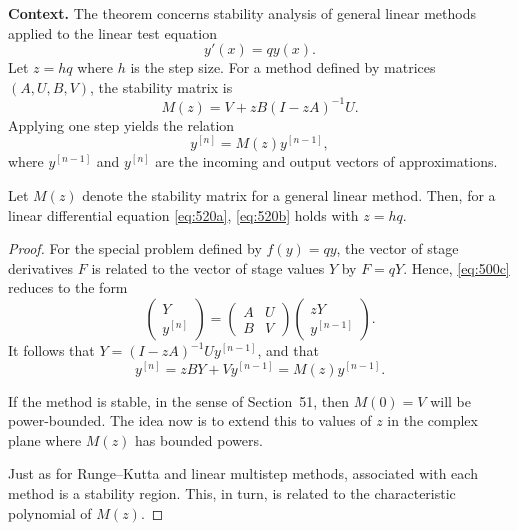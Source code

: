 \noindent\textbf{Context.}
The theorem concerns stability analysis of general linear methods applied to the linear test equation
\begin{equation}
y'(x)=qy(x). \tag{520a}
\end{equation}
Let \(z=hq\) where \(h\) is the step size. For a method defined by matrices \((A,U,B,V)\), the stability matrix is
\[
M(z)=V+zB(I-zA)^{-1}U.
\]
Applying one step yields the relation
\begin{equation}
y^{[n]}=M(z)y^{[n-1]}, \tag{520b}
\end{equation}
where \(y^{[n-1]}\) and \(y^{[n]}\) are the incoming and output vectors of approximations.

\begin{theorem}

  \label{thm:520B}
Let \( M(z) \) denote the stability matrix for a general linear method. Then, for a linear differential equation \eqref{eq:520a}, \eqref{eq:520b} holds with \( z = hq \).
\end{theorem}

\begin{proof}
For the special problem defined by \( f(y) = qy \), the vector of stage derivatives \( F \) is related to the vector of stage values \( Y \) by \( F = qY \). Hence, \eqref{eq:500c} reduces to the form
\[
\begin{pmatrix} Y \\ y^{[n]} \end{pmatrix} = \begin{pmatrix} A & U \\ B & V \end{pmatrix} \begin{pmatrix} zY \\ y^{[n-1]} \end{pmatrix}.
\]
It follows that \( Y = (I - zA)^{-1} U y^{[n-1]} \), and that
\[
y^{[n]} = zBY + V y^{[n-1]} = M(z) y^{[n-1]}.
\]

If the method is stable, in the sense of Section~51, then \( M(0) = V \) will be power-bounded. The idea now is to extend this to values of \( z \) in the complex plane where \( M(z) \) has bounded powers.

Just as for Runge--Kutta and linear multistep methods, associated with each method is a stability region. This, in turn, is related to the characteristic polynomial of \( M(z) \).
\end{proof}

